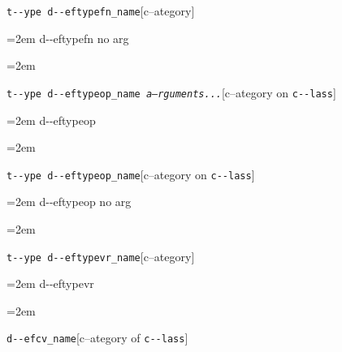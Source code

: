 \documentclass{book}
\begin{document}
\endgroup{}%
\noindent\texttt{t{-}{-}ype d{-}{-}eftypefn\_name}\hfill[c--ategory]



%
\par\begingroup\obeylines\obeyspaces\frenchspacing\leftskip=2em\relax\parskip=0pt\relax\ttfamily{}%
d{-}{-}eftypefn no arg
\endgroup{}%
\par\begingroup\obeylines\obeyspaces\frenchspacing\leftskip=2em\relax\parskip=0pt\relax\ttfamily{}%

\endgroup{}%
\noindent\texttt{t{-}{-}ype d{-}{-}eftypeop\_name \bgroup{}\normalfont{}\textsl{a--rguments...}\egroup{}}\hfill[c--ategory on \texttt{c{-}{-}lass}]



%
\par\begingroup\obeylines\obeyspaces\frenchspacing\leftskip=2em\relax\parskip=0pt\relax\ttfamily{}%
d{-}{-}eftypeop
\endgroup{}%
\par\begingroup\obeylines\obeyspaces\frenchspacing\leftskip=2em\relax\parskip=0pt\relax\ttfamily{}%

\endgroup{}%
\noindent\texttt{t{-}{-}ype d{-}{-}eftypeop\_name}\hfill[c--ategory on \texttt{c{-}{-}lass}]



%
\par\begingroup\obeylines\obeyspaces\frenchspacing\leftskip=2em\relax\parskip=0pt\relax\ttfamily{}%
d{-}{-}eftypeop no arg
\endgroup{}%
\par\begingroup\obeylines\obeyspaces\frenchspacing\leftskip=2em\relax\parskip=0pt\relax\ttfamily{}%

\endgroup{}%
\noindent\texttt{t{-}{-}ype d{-}{-}eftypevr\_name}\hfill[c--ategory]



%
\par\begingroup\obeylines\obeyspaces\frenchspacing\leftskip=2em\relax\parskip=0pt\relax\ttfamily{}%
d{-}{-}eftypevr
\endgroup{}%
\par\begingroup\obeylines\obeyspaces\frenchspacing\leftskip=2em\relax\parskip=0pt\relax\ttfamily{}%

\endgroup{}%
\noindent\texttt{d{-}{-}efcv\_name}\hfill[c--ategory of \texttt{c{-}{-}lass}]
\end{document}
